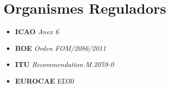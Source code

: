 
\section{Organismes Reguladors}
\begin{multicols}{2}
\begin{itemize}
\item \textbf{ICAO} \textit{Anex 6}
\item \textbf{BOE} \textit{Orden FOM/2086/2011}
\item \textbf{ITU} \textit{Recommendation M.2059-0}
\item \textbf{EUROCAE} ED30 \cite{Itu-r2014}
\end{itemize}
\end{multicols}